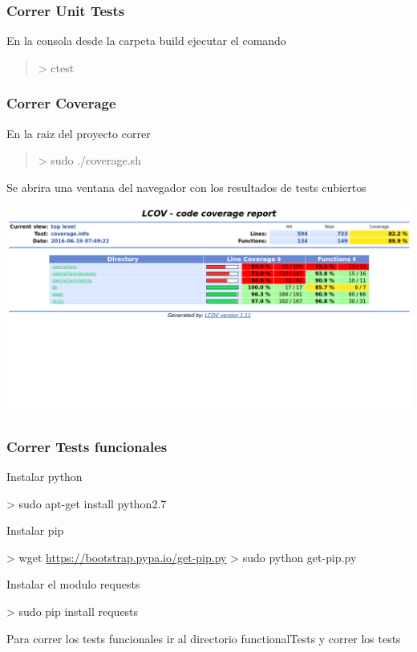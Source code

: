 \documentclass[letterpaper,10pt,english]{sphinxmanual}
\begin{document}
\subsubsection{Correr Unit Tests}
\label{manuals:correr-unit-tests}
En la consola desde la carpeta build ejecutar el comando
\begin{quote}

\textgreater{} ctest
\end{quote}


\subsubsection{Correr Coverage}
\label{manuals:correr-coverage}
En la raiz del proyecto correr
\begin{quote}

\textgreater{} sudo ./coverage.sh
\end{quote}

Se abrira una ventana del navegador con los resultados de tests cubiertos

\includegraphics{coverage.png}


\subsubsection{Correr Tests funcionales}
\label{manuals:correr-tests-funcionales}
Instalar python

\textgreater{} sudo apt-get install python2.7

Instalar pip

\textgreater{} wget \href{https://bootstrap.pypa.io/get-pip.py}{https://bootstrap.pypa.io/get-pip.py}
\textgreater{} sudo python get-pip.py

Instalar el modulo requests

\textgreater{} sudo pip install requests

Para correr los tests funcionales ir al directorio functionalTests y correr los tests
\end{document}
